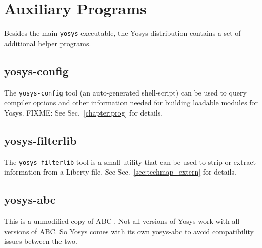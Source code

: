 
\chapter{Auxiliary Programs}

Besides the main {\tt yosys} executable, the Yosys distribution contains a set
of additional helper programs.

\section{yosys-config}

The {\tt yosys-config} tool (an auto-generated shell-script) can be used to
query compiler options and other information needed for building loadable
modules for Yosys. FIXME: See Sec.~\ref{chapter:prog} for details.

\section{yosys-filterlib}
\label{sec:filterlib}

The {\tt yosys-filterlib} tool is a small utility that can be used to strip
or extract information from a Liberty file. See Sec.~\ref{sec:techmap_extern}
for details.

\section{yosys-abc}

This is a unmodified copy of ABC . Not all versions of Yosys
work with all versions of ABC. So Yosys comes with its own yosys-abc to avoid
compatibility issues between the two.

